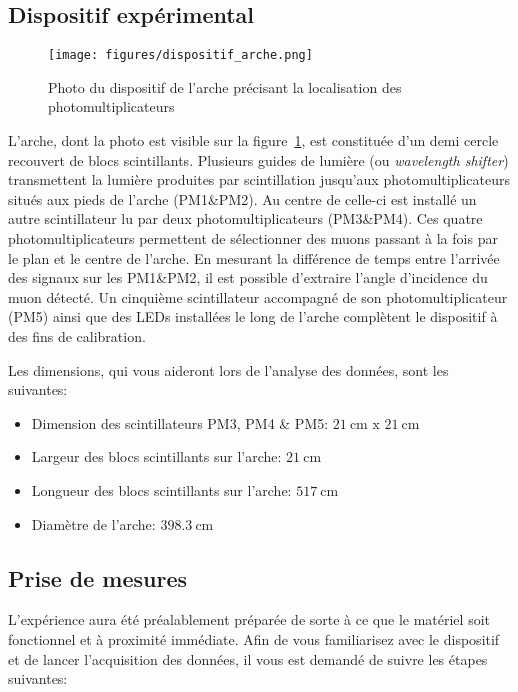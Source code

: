 \subsection{Dispositif expérimental}

\begin{figure}
\begin{center}
    \texttt{[image: figures/dispositif\_arche.png]}
\end{center}
\caption{Photo du dispositif de l'arche précisant la localisation des photomultiplicateurs}
\label{fig:dispositif_arche}
\end{figure}

L'arche, dont la photo est visible sur la figure~\ref{fig:dispositif_arche}, est constituée d'un demi cercle recouvert de blocs scintillants.
Plusieurs guides de lumière (ou \textit{wavelength shifter}) transmettent la lumière produites par scintillation jusqu'aux photomultiplicateurs situés aux pieds de l'arche (PM1\&PM2).
Au centre de celle-ci est installé un autre scintillateur lu par deux photomultiplicateurs (PM3\&PM4).
Ces quatre photomultiplicateurs permettent de sélectionner des muons passant à la fois par le plan et le centre de l'arche.
En mesurant la différence de temps entre l'arrivée des signaux sur les PM1\&PM2, il est possible d'extraire l'angle d'incidence du muon détecté.
Un cinquième scintillateur accompagné de son photomultiplicateur (PM5) ainsi que des LEDs installées le long de l'arche complètent le dispositif à des fins de calibration.

Les dimensions, qui vous aideront lors de l'analyse des données, sont les suivantes:
\begin{itemize}
    \item Dimension des scintillateurs PM3, PM4 \& PM5: \(\SI{21}{\cm}\textrm{ x }\SI{21}{\cm}\)
    \item Largeur des blocs scintillants sur l'arche: \(\SI{21}{\cm}\)
    \item Longueur des blocs scintillants sur l'arche: \(\SI{517}{\cm}\)
    \item Diamètre de l'arche: \(\SI{398.3}{\cm}\)
\end{itemize}

\subsection{Prise de mesures}
L'expérience aura été préalablement préparée de sorte à ce que le matériel soit fonctionnel et à proximité immédiate.
Afin de vous familiarisez avec le dispositif et de lancer l'acquisition des données, il vous est demandé de suivre les étapes suivantes:

